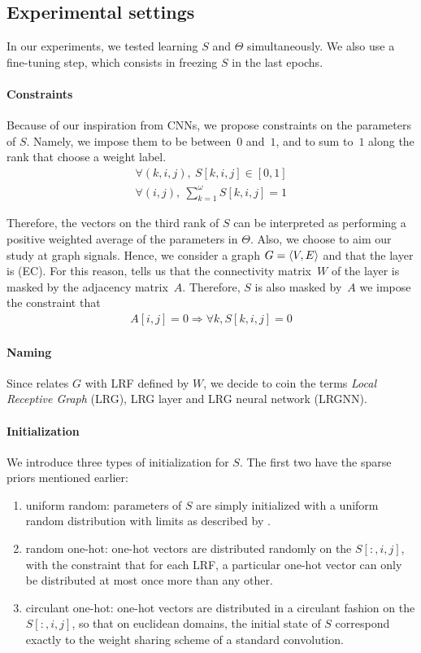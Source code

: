 \subsection{Experimental settings}
In our experiments, we tested learning $S$ and $\Theta$ simultaneously. We also use a fine-tuning step, which consists in freezing $S$ in the last epochs.

\paragraph{Constraints}
Because of our inspiration from CNNs, we propose constraints on the parameters of $S$. Namely, we impose them to be between~$0$ and~$1$, and to sum to~$1$ along the rank that choose a weight label.
\begin{gather}
\forall (k,i,j),~S[k,i,j] \in [0,1]\\
\forall (i,j),~\displaystyle \sum_{k=1}^\omega S[k,i,j] = 1
\end{gather}

Therefore, the vectors on the third rank of $S$ can be interpreted as performing a positive weighted average of the parameters in $\Theta$.
Also, we choose to aim our study at graph signals. Hence, we consider a graph $G = \langle V, E \rangle$ and that the layer is (EC). For this reason,  tells us that the connectivity matrix~$W$ of the layer is masked by the adjacency matrix~$A$. Therefore, $S$ is also masked by~$A$ \ie we impose the constraint that
\begin{gather}
A[i,j] = 0 \Rightarrow \forall k, S[k,i,j] = 0
\end{gather}

\paragraph{Naming}
Since  relates $G$ with LRF defined by $W$, we decide to coin the terms \emph{Local Receptive Graph} (LRG), LRG layer and LRG neural network (LRGNN).

\paragraph{Initialization}
We introduce three types of initialization for $S$. The first two have the sparse priors mentioned earlier:
\begin{enumerate}
  \item uniform random: parameters of $S$ are simply initialized with a uniform random distribution with limits as described by \cite{glorot2010understanding}.
  \item random one-hot: one-hot vectors are distributed randomly on the $S[:,i,j]$, with the constraint that for each LRF, a particular one-hot vector can only be distributed at most once more than any other.
  \item circulant one-hot: one-hot vectors are distributed in a circulant fashion on the $S[:,i,j]$, so that on euclidean domains, the initial state of $S$ correspond exactly to the weight sharing scheme of a standard convolution.
\end{enumerate}

